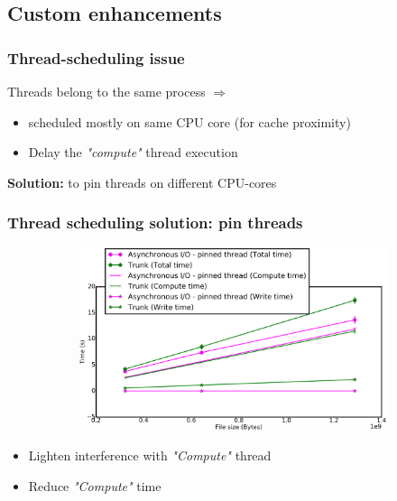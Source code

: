\documentclass[slidestop,xcolor=dvipsnames, notes=hide]{beamer}
\begin{document}
	\subsection{Custom enhancements}
		\begin{frame}
			\frametitle{Thread-scheduling issue}
			Threads belong to the same process $\Rightarrow$
			\begin{itemize}
				\item scheduled mostly on same CPU core (for cache proximity)
				\item Delay the \emph{"compute"} thread execution
			\end{itemize}
			\pause
			\textbf{Solution:} to pin threads on different CPU-cores
		\end{frame}


		\begin{frame}
			\frametitle{Thread scheduling solution: pin threads}
			\center
			\begin{figure}[!h]
				\centering
				\begin{subfigure}[b]{0.73\textwidth}
					\centering
					\includegraphics[width=\textwidth]{images/cubeRemapper_pthreadWrap_hpc.png}
				\end{subfigure}
			\end{figure}

			\begin{block}{}
			\begin{itemize}
				\item Lighten interference with \emph{"Compute"} thread
				\item Reduce \emph{"Compute"} time
			\end{itemize}
			\end{block}
		\end{frame}
\end{document}
